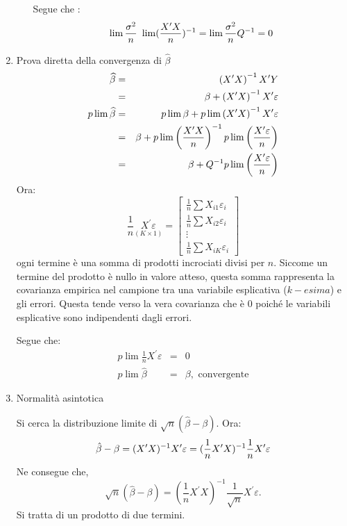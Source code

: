 \documentclass[a4paper]{report}
\newcounter{ese}
\theoremstyle{remark}
\begin{document}
\begin{enumerate}
\begin{itemize}
Segue che :%
\begin{equation*}
\lim \frac{\sigma ^{2}}{n}\ \lim (\frac{X^{\prime }X}{n})^{-1}=\lim \frac{%
\sigma ^{2}}{n}Q^{-1}=0
\end{equation*}
\end{itemize}

\item {Prova diretta della convergenza di $\hat{\beta}$} 
\begin{eqnarray*}
\widehat{\beta } &=&\left( X^{\prime }X\right) ^{-1}X^{\prime }Y \\
&=&\beta +\left( X^{\prime }X\right) ^{-1}X^{\prime }\varepsilon \\
p\lim \widehat{\beta } &=&p\lim \beta +p\lim \left( X^{\prime }X\right)
^{-1}X^{\prime }\varepsilon \\
&=&\beta +p\lim \left( \frac{X^{\prime }X}{n}\right) ^{-1}p\lim \left( \frac{%
X^{\prime }\varepsilon }{n}\right) \\
&=&\beta +Q^{-1}p\lim \left( \frac{X^{\prime }\varepsilon }{n}\right)
\end{eqnarray*}%
Ora:%
\begin{equation*}
\frac{1}{n}\underset{(K\times 1)}{X^{\prime }\varepsilon }=\left[ 
\begin{array}{c}
\frac{1}{n}\sum X_{i1}\varepsilon _{i} \\ 
\frac{1}{n}\sum X_{i2}\varepsilon _{i} \\ 
\vdots \\ 
\frac{1}{n}\sum X_{iK}\varepsilon _{i}%
\end{array}%
\right]
\end{equation*}%
ogni termine \`{e} una somma di prodotti incrociati divisi per $n$. Siccome
un termine del prodotto \`{e} nullo in valore atteso, questa somma
rappresenta la covarianza empirica nel campione tra una variabile
esplicativa ($k-esima$) e gli errori. Questa tende verso la vera covarianza
che \`{e} $0$ poich\'{e} le variabili esplicative sono indipendenti dagli
errori.

Segue che: 
\begin{eqnarray*}
p\lim \frac{1}{n}X^{\prime }\varepsilon &=&0 \\
p\lim \hat{\beta} &=&\beta ,\text{ convergente}
\end{eqnarray*}

\item {Normalit\`{a} asintotica}

Si cerca la distribuzione limite di $\sqrt{n}(\hat{\beta}-\beta )$. Ora: 
\begin{equation*}
\hat{\beta}-\beta =(X^{\prime }X)^{-1}X^{\prime }\varepsilon \\
=(\frac{1}{n}X^{\prime }X)^{-1}\frac{1}{n}X^{\prime }\varepsilon
\end{equation*}%
Ne consegue che, 
\begin{equation*}
\sqrt{n}(\hat{\beta}-\beta )=(\frac{1}{n}X^{\prime }X)^{-1}\frac{1}{\sqrt{n}}%
X^{\prime }\varepsilon .
\end{equation*}%
Si tratta di un prodotto di due termini.


\end{enumerate}
\end{document}
